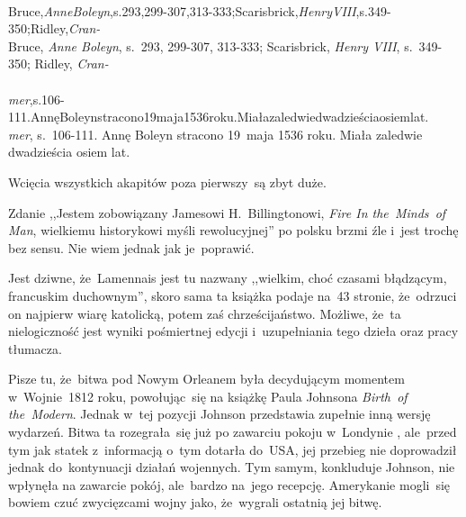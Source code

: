 \documentclass[a4paper,11pt]{article}
\begin{document}
\noi
{} \\
\Jest Bruce,\emph{AnneBoleyn},s.293,299-307,313-333;Scarisbrick,\emph{HenryVIII},s.349-350;Ridley,\emph{Cran-} \\
\Pow  Bruce, \emph{Anne Boleyn}, s.~293, 299-307, 313-333; Scarisbrick, \emph{Henry VIII}, s.~349-350; Ridley, \emph{Cran-} \\
 \\
\Jest
\emph{mer},s.106-111.AnnęBoleynstracono19maja1536roku.Miałazaledwiedwadzieściaosiemlat. \\
\Pow \emph{mer}, s.~106-111. Annę Boleyn stracono 19~maja 1536 roku.
Miała zaledwie dwadzieścia osiem lat. \\

\vspace{\spaceTwo}








\start {} Wcięcia wszystkich akapitów poza pierwszy~są zbyt
duże.

\vspace{\spaceFour}


\start {} Zdanie ,,Jestem zobowiązany Jamesowi
H.~Billingtonowi, \emph{Fire In the~Minds~of Man}, wielkiemu
historykowi myśli rewolucyjnej'' po polsku brzmi źle i~jest trochę bez
sensu. Nie wiem jednak jak je~poprawić.

\vspace{\spaceFour}


\start {} Jest dziwne, że~Lamennais jest tu nazwany ,,wielkim,
choć czasami błądzącym, francuskim duchownym'', skoro sama ta książka
podaje na~43 stronie, że~odrzuci on najpierw wiarę katolicką, potem
zaś chrześcijaństwo. Możliwe, że~ta nielogiczność jest wyniki
pośmiertnej edycji i~uzupełniania tego dzieła oraz pracy tłumacza.

\vspace{\spaceFour}


\start {} Pisze tu, że~bitwa pod Nowym Orleanem była decydującym
momentem w~Wojnie~1812 roku, powołując~się na książkę Paula Johnsona
\emph{Birth~of the~Modern}. Jednak w~tej pozycji Johnson przedstawia
zupełnie inną wersję wydarzeń. Bitwa ta rozegrała~się już po zawarciu
pokoju w~Londynie , ale~przed tym jak statek
z~informacją o~tym dotarła do~USA, jej przebieg nie doprowadził jednak
do~kontynuacji działań wojennych. Tym samym, konkluduje Johnson, nie
wpłynęła na zawarcie pokój, ale~bardzo na~jego recepcję. Amerykanie
mogli~się bowiem czuć zwycięzcami wojny jako, że~wygrali ostatnią jej
bitwę.
\end{document}

